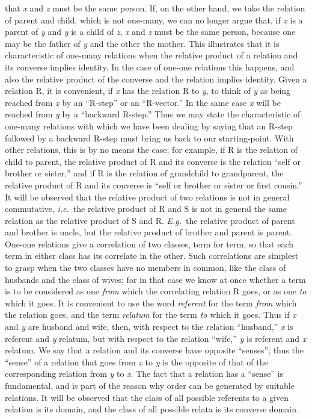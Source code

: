 {that \textit{x} and
\textit{z}
must be   the same
person. If, on the other hand, we take
the relation of parent and child, which is not one-many, we can no
longer argue that, if \textit{x}
is a parent of \textit{y}
and \textit{y} is a
child of \textit{z},
\textit{x} and
\textit{z}
must be the same person, because one may be the father of \textit{y} and the
other the mother. This illustrates that it is characteristic of
one-many relations when the relative product of a relation and its
converse implies identity. In the case of one-one relations this
happens, and also the relative product of the converse and the relation
implies identity. Given a relation R, it is convenient, if \textit{x} has the
relation R to \textit{y},
to think of \textit{y}
as being reached from \textit{x}
by an ``R-step''
or an ``R-vector.'' In the same case \textit{x}
will be reached from \textit{y}
by a
``backward R-step.'' Thus we may state the characteristic of one-many
relations with which we have been dealing by saying that an R-step
followed by a backward R-step must bring us back to our
starting-point. With other relations, this is by no means the case; for
example, if R is the relation of child to parent, the relative product
of R and its converse is the relation ``self or brother or sister,'' and
if R is the relation of grandchild to grandparent, the relative product
of R and its converse is ``self or brother or sister or first cousin.''
It will be observed that the relative product of two
relations
is not
in general commutative, \textit{i.e.}\ the relative product of R and S is not in
general the same relation as the relative product of S and R. \textit{E.g.}\ the
relative product of parent and brother is uncle, but the relative
product of brother and parent is parent.\\
\indent One-one relations give a correlation of two class\-es,
term
for
term, so
that each term in either class has its correlate in the other. Such
correlations are simplest to grasp when the two classes have no members
in common, like the class of husbands and the class of wives; for in
that case we know at once whether a term is to be considered as one
\textit{from}
which
the correlating relation R goes, or as one \textit{to} which it goes.
It is convenient to use the word \textit{referent}
for the term \textit{from}
which the
relation goes, and the term \textit{relatum}
for the term \textit{to}
which it goes. Thus
if \textit{x} and \textit{y} are husband and wife, then, with respect to the relation   ``husband,'' \textit{x}
is referent and \textit{y}
relatum, but with respect to the
relation ``wife,'' \textit{y}
is referent and \textit{x}
relatum. We say that a relation
and its converse have opposite ``senses''; thus the ``sense'' of a relation
that goes from \textit{x}
to \textit{y} is
the opposite of that of the corresponding
relation from \textit{y}
to \textit{x}. The
fact that a relation has a ``sense'' is
fundamental, and is part of the reason why order can be generated by
suitable relations. It will be observed that the class of all possible
referents to a given relation is its domain, and the class of all
possible relata is its converse domain.}
